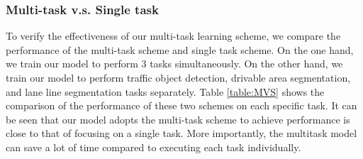 \documentclass[10pt,twocolumn,letterpaper]{article}
\begin{document}
\begin{table*}[bh]
\begin{center}
\end{center}
\caption{Panoptic driving perception results: the end-to-end scheme v.s. different step-by-step schemes.}
\label{table:EVS}
\end{table*}

\subsubsection{Multi-task v.s. Single task}
To verify the effectiveness of our multi-task learning scheme, we compare the performance of the multi-task scheme and single task scheme. On the one hand, we train our model to perform 3 tasks simultaneously. On the other hand, we train our model to perform traffic object detection, drivable area segmentation, and lane line segmentation tasks separately. Table \ref{table:MVS} shows the comparison of the performance of these two schemes on each specific task. It can be seen that our model adopts the multi-task scheme to achieve performance is close to that of focusing on a single task. More importantly, the multitask model can save a lot of time compared to executing each task individually.
\end{document}
